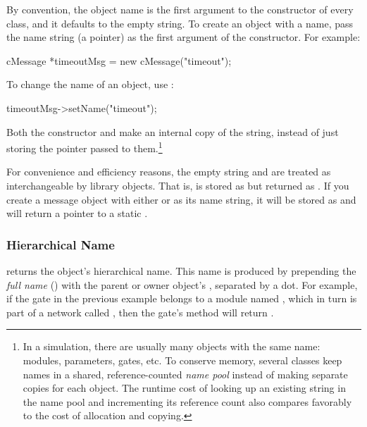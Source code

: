 By convention, the object name is the first argument to the constructor
of every class, and it defaults to the empty string. To create an object with
a name, pass the name string (a  pointer) as the first
argument of the constructor. For example:

\begin{cpp}
cMessage *timeoutMsg = new cMessage("timeout");
\end{cpp}

To change the name of an object, use :

\begin{cpp}
timeoutMsg->setName("timeout");
\end{cpp}

Both the constructor and  make an internal copy of the string,
instead of just storing the pointer passed to them.\footnote{
  In a simulation, there are usually many objects with the same name:
  modules, parameters, gates, etc. To conserve memory, several classes
  keep names in a shared, reference-counted \textit{name pool} instead of
  making separate copies for each object. The runtime cost of looking up an
  existing string in the name pool and incrementing its reference count
  also compares favorably to the cost of allocation and copying.}

For convenience and efficiency reasons, the empty string 
and  are treated as interchangeable by library objects.
That is,  is stored as  but returned as .
If you create a message object with either 
or  as its name string, it will be stored as 
and  will return a pointer to a static .


\subsubsection{Hierarchical Name}
\label{sec:sim-lib:fullpath}

 returns the object's hierarchical name. This name is
produced by prepending the \textit{full name} () with
the parent or owner object's , separated by a dot. For
example, if the  gate in the previous example belongs to a
module named , which in turn is part of a network called
, then the gate's  method will return
.

